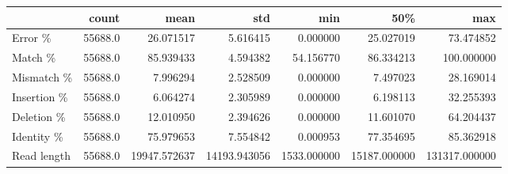 \begin{tabular}{lrrrrrr}
\toprule
{} &    count &          mean &           std &          min &           50\% &            max \\
\midrule
Error \%     &  55688.0 &     26.071517 &      5.616415 &     0.000000 &     25.027019 &      73.474852 \\
Match \%     &  55688.0 &     85.939433 &      4.594382 &    54.156770 &     86.334213 &     100.000000 \\
Mismatch \%  &  55688.0 &      7.996294 &      2.528509 &     0.000000 &      7.497023 &      28.169014 \\
Insertion \% &  55688.0 &      6.064274 &      2.305989 &     0.000000 &      6.198113 &      32.255393 \\
Deletion \%  &  55688.0 &     12.010950 &      2.394626 &     0.000000 &     11.601070 &      64.204437 \\
Identity \%  &  55688.0 &     75.979653 &      7.554842 &     0.000953 &     77.354695 &      85.362918 \\
Read length &  55688.0 &  19947.572637 &  14193.943056 &  1533.000000 &  15187.000000 &  131317.000000 \\
\bottomrule
\end{tabular}
